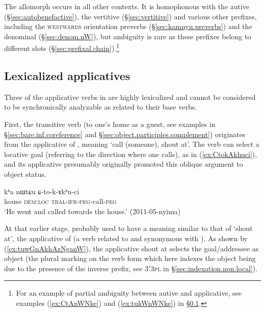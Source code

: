 The allomorph  occurs in all other contexts. It is homophonous with the autive (§\ref{sec:autobenefactive}), the vertitive (§\ref{sec:vertitive}) and various other prefixes, including the \textsc{westwards} orientation preverbs (§\ref{sec:kamnyu.preverbs}) and the denominal  (§\ref{sec:denom.nW}), but ambiguity is rare as these prefixes belong to different slots (§\ref{sec:prefixal.chain}).\footnote{For an example of partial ambiguity between autive and applicative, see examples (\ref{ex:CtAnWNke}) and (\ref{ex:tukWnWNke}) in §\ref{sec:applicative.lexicalized}. } 


\subsection{Lexicalized applicatives} \label{sec:applicative.lexicalized} 
Three of the applicative verbs in  are highly lexicalized and cannot be considered to be synchronically analyzable as related to their base verbs.
 
First, the transitive verb  (to one's home as a guest, see examples in §\ref{sec:bare.inf.coreference} and §\ref{sec:object.participles.complement}) originates from the applicative  of , meaning `call (someone), shout at'. The verb  can select a locative goal (referring to the direction where one calls), as in (\ref{ex:CtokAkhuci}), and its applicative  presumably originally promoted this oblique argument to object status.

\begin{exe}
\ex \label{ex:CtokAkhuci}
\gll kʰa nɯtɕu ɕ-to-k-ɤkʰu-ci \\
house \textsc{dem}:\textsc{loc} \textsc{tral}-\textsc{ifr}-\textsc{peg}-call-\textsc{peg} \\
\glt `He went and called towards the house.' (2011-05-nyima)
\end{exe}

At that earlier stage,  probably used to have a meaning similar to that of  `shout at', the applicative of  (a verb related to and synonymous with ). As shown by (\ref{ex:tuwGnAkhAzNganW}), the applicative  {shout at} selects the goal/addressee as object (the plural marking on the verb form which here indexes the object being due to the presence of the inverse prefix, see 3$'$\fl{}\textsc{3pl} in §\ref{sec:indexation.non.local}). 


